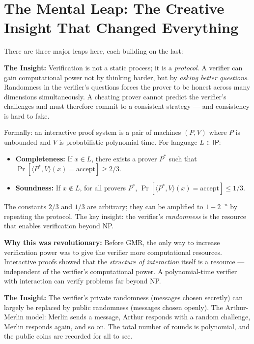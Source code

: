 \section{The Mental Leap: The Creative Insight That Changed Everything}
\label{sec:ip:leap}

There are three major leaps here, each building on the last:

\textbf{The Insight:} Verification is not a static process; it is a \emph{protocol}. A verifier can gain computational power not by thinking harder, but by \emph{asking better questions}. Randomness in the verifier's questions forces the prover to be honest across many dimensions simultaneously. A cheating prover cannot predict the verifier's challenges and must therefore commit to a consistent strategy --- and consistency is hard to fake.

Formally: an interactive proof system is a pair of machines $(P, V)$ where $P$ is unbounded and $V$ is probabilistic polynomial time. For language $L \in \mathsf{IP}$:
\begin{itemize}
\item \textbf{Completeness:} If $x \in L$, there exists a prover $P^*$ such that $\Pr[\langle P^*, V \rangle(x) = \text{accept}] \ge 2/3$.
\item \textbf{Soundness:} If $x \notin L$, for all provers $P^*$, $\Pr[\langle P^*, V \rangle(x) = \text{accept}] \le 1/3$.
\end{itemize}
The constants $2/3$ and $1/3$ are arbitrary; they can be amplified to $1 - 2^{-n}$ by repeating the protocol. The key insight: the verifier's \emph{randomness} is the resource that enables verification beyond NP.

\textbf{Why this was revolutionary:} Before GMR, the only way to increase verification power was to give the verifier more computational resources. Interactive proofs showed that the \emph{structure of interaction} itself is a resource --- independent of the verifier's computational power. A polynomial-time verifier with interaction can verify problems far beyond NP.

\textbf{The Insight:} The verifier's private randomness (messages chosen secretly) can largely be replaced by public randomness (messages chosen openly). The Arthur-Merlin model: Merlin sends a message, Arthur responds with a random challenge, Merlin responds again, and so on. The total number of rounds is polynomial, and the public coins are recorded for all to see.

